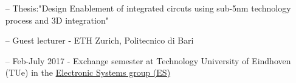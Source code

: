 \documentclass[10pt,a4paper,fancychapters]{altacv}
\begin{document}



\begin{itemize}
    \setlength{\itemindent}{0.5em}
    \item[--] \small{Thesis:"Design Enablement of integrated circuts using sub-5nm technology process and 3D integration"}
    \item[--] \small{Guest lecturer - ETH Zurich, Politecnico di Bari} 
\end{itemize}
\medskip




\medskip

\begin{itemize}
    \setlength{\itemindent}{0.5em}
    \item[--] \small{Feb-July 2017 - Exchange semester at Technology University of Eindhoven (TUe) in the
    \href{https://research.tue.nl/en/organisations/electronic-systems}{Electronic Systems group (ES)}}
\end{itemize}

\medskip
\end{document}
